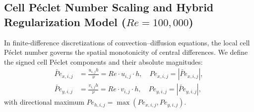 \documentclass[11pt,a4paper]{article}
\begin{document}
\subsection{\texorpdfstring{Cell P\'eclet Number Scaling and Hybrid Regularization Model ($Re = 100,000$)}{Cell Peclet Number Scaling and Hybrid Regularization Model (Re = 100000)}}
In finite-difference discretizations of convection--diffusion equations, the local cell P\'eclet number governs the spatial monotonicity of central differences. We define the signed cell P\'eclet components and their absolute magnitudes:
\begin{align}
    \widetilde{Pe}_{x, i, j} &= \frac{u_{i, j} h}{\nu} = Re \cdot u_{i, j} \cdot h, \quad Pe_{x, i, j} = |\widetilde{Pe}_{x, i, j}|, \\
    \widetilde{Pe}_{y, i, j} &= \frac{v_{i, j} h}{\nu} = Re \cdot v_{i, j} \cdot h, \quad Pe_{y, i, j} = |\widetilde{Pe}_{y, i, j}|,
\end{align}
with directional maximum $Pe_{h, i, j} = \max(Pe_{x, i, j}, Pe_{y, i, j})$.
\end{document}

